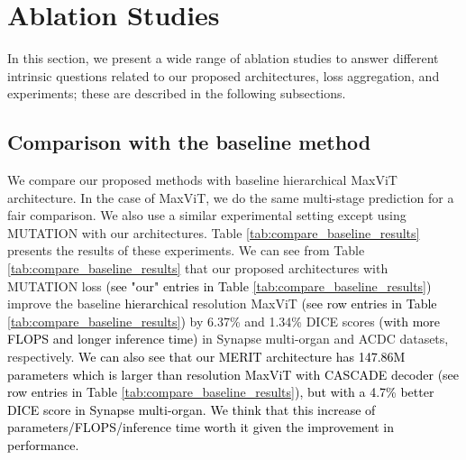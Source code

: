 \documentclass{midl}
\begin{document}
\section{Ablation Studies}
\label{asec:ablation_studies}
In this section, we present a wide range of ablation studies to answer different intrinsic questions related to our proposed architectures, loss aggregation, and experiments; these are described in the following subsections.

\subsection{Comparison with the baseline method}
\label{assec:baseline_compare}
We compare our proposed methods with baseline hierarchical MaxViT architecture. In the case of MaxViT, we do the same multi-stage prediction for a fair comparison. We also use a similar experimental setting except using MUTATION with our architectures. Table \ref{tab:compare_baseline_results} presents the results of these experiments. We can see from Table \ref{tab:compare_baseline_results} that our proposed architectures with MUTATION loss \textcolor{black}{(see "our" entries in Table \ref{tab:compare_baseline_results})} improve the baseline \textcolor{black}{hierarchical } resolution MaxViT \textcolor{black}{(see  row entries in Table \ref{tab:compare_baseline_results})} by 6.37\% and 1.34\% DICE scores \textcolor{black}{(with  more FLOPS and  longer inference time)} in Synapse multi-organ and ACDC datasets, respectively. \textcolor{black}{We can also see that our MERIT architecture has 147.86M parameters which is  larger than  resolution MaxViT with CASCADE decoder (see  row entries in Table \ref{tab:compare_baseline_results}), but with a 4.7\% better DICE score in Synapse multi-organ. We think that this increase of parameters/FLOPS/inference time worth it given the improvement in performance.}
\end{document}
